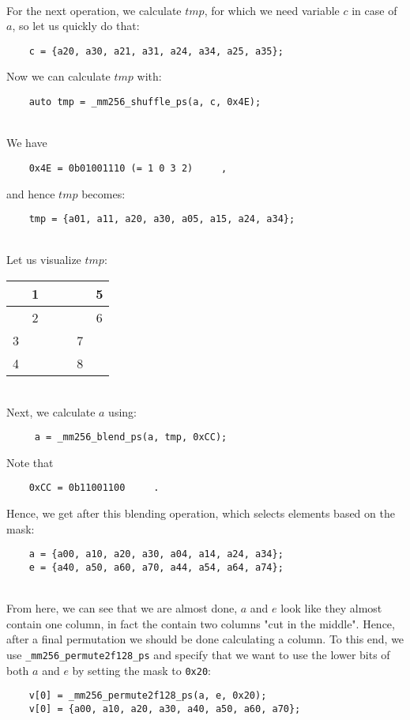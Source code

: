 \documentclass[../../main.tex]{subfiles}
\begin{document}
~\\
For the next operation, we calculate $tmp$, for which we need variable $c$ in case of $a$, so let us quickly do that:
\begin{lstlisting}
    c = {a20, a30, a21, a31, a24, a34, a25, a35};
\end{lstlisting}
Now we can calculate $tmp$ with:
\begin{lstlisting}
    auto tmp = _mm256_shuffle_ps(a, c, 0x4E);
\end{lstlisting}

~\\
We have
\begin{verbatim}
    0x4E = 0b01001110 (= 1 0 3 2)     ,
\end{verbatim}
and hence $tmp$ becomes:
\begin{lstlisting}
    tmp = {a01, a11, a20, a30, a05, a15, a24, a34};
\end{lstlisting}

~\\
Let us visualize $tmp$:

\begin{table}[h]
    \begin{tabular}{c|c|c|c|c|c}
        &1&&&&5\\
        \hline
        &2&&&&6\\
        \hline
        3&&&&7&\\
        \hline
        4&&&&8&
    \end{tabular}
\end{table}

~\\
Next, we calculate $a$ using:
\begin{lstlisting}
     a = _mm256_blend_ps(a, tmp, 0xCC);
\end{lstlisting}
Note that
\begin{verbatim}
    0xCC = 0b11001100     .
\end{verbatim}
Hence, we get after this blending operation, which selects elements based on the mask:
\begin{lstlisting}
    a = {a00, a10, a20, a30, a04, a14, a24, a34};
    e = {a40, a50, a60, a70, a44, a54, a64, a74};
\end{lstlisting}

~\\
From here, we can see that we are almost done, $a$ and $e$ look like they almost contain one column, in fact the contain two columns "cut in the middle". Hence, after a final permutation we should be done calculating a column. To this end, we use \texttt{\_mm256\_permute2f128\_ps} and specify that we want to use the lower bits of both $a$ and $e$ by setting the mask to \texttt{0x20}:
\begin{lstlisting}
    v[0] = _mm256_permute2f128_ps(a, e, 0x20);
    v[0] = {a00, a10, a20, a30, a40, a50, a60, a70};
\end{lstlisting}
\end{document}
